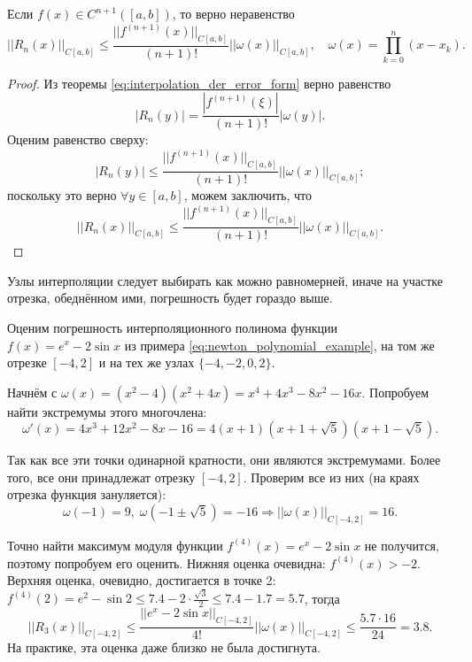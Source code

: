 \documentclass[../main.tex]{subfile}
\begin{document}
\begin{corollary}
	Если $f(x)\in C^{n+1}([a,b])$, то верно неравенство
	\[||R_n(x)||_{C[a,b]}\le \frac{||f^{(n+1)}(x)||_{C[a,b]}}{(n+1)!}
	||\omega(x)||_{C[a,b]},\quad \omega(x)=\prod_{k=0}^{n}(x-x_k).\]
\end{corollary}

\begin{proof}
	Из теоремы \eqref{eq:interpolation_der_error_form} верно равенство
	\[|R_n(y)|=\frac{|f^{(n+1)}(\xi)|}{(n+1)!}|\omega(y)|.\]
	Оценим равенство сверху:
	\[|R_n(y)|\le\frac{||f^{(n+1)}(x)||_{C[a,b]}}{(n+1)!}||\omega(x)||_
	{C[a,b]};\]
	поскольку это верно $\forall y\in[a,b]$, можем заключить, что
	\[||R_n(x)||_{C[a,b]}\le \frac{||f^{(n+1)}(x)||_{C[a,b]}}{(n+1)!}
	||\omega(x)||_{C[a,b]}.\]
\end{proof}

Узлы интерполяции следует выбирать как можно равномерней, иначе на участке
отрезка, обеднённом ими, погрешность будет гораздо выше.

\begin{example}
	Оценим погрешность интерполяционного полинома функции $f(x)=e^x-2\sin x$
	из примера \eqref{eq:newton_polynomial_example}, на том
	же отрезке $[-4,2]$ и на тех же узлах $\{-4,-2,0,2\}$.

	Начнём с $\omega(x)=(x^2-4)(x^2+4x)=x^4+4x^3-8x^2-16x$. Попробуем найти
	экстремумы этого многочлена:
	\[\omega'(x)=4x^3+12x^2-8x-16=4(x+1)(x+1+\sqrt 5)(x+1-\sqrt 5).\]

	Так как все эти точки одинарной кратности, они являются экстремумами.
	Более того, все они принадлежат отрезку $[-4,2]$. Проверим все из них
	(на краях отрезка функция зануляется):
	\[\omega(-1)=9,\;\omega(-1\pm\sqrt 5)=-16\Rightarrow
	||\omega(x)||_{C[-4,2]}=16.\]

	Точно найти максимум модуля функции $f^{(4)}(x)=e^x-2\sin x$ не
	получится, поэтому попробуем его оценить. Нижняя оценка очевидна:
	$f^{(4)}(x)>-2$. Верхняя оценка, очевидно, достигается в точке 2:
	$f^{(4)}(2)=e^2-\sin 2\le 7.4-2\cdot\frac{\sqrt 3}{2}\le 7.4-1.7=5.7$,
	тогда
	\[||R_3(x)||_{C[-4,2]}\le\frac{||e^x-2\sin x||_{C[-4,2]}}{4!}
	||\omega(x)||_{C[-4,2]}\le\frac{5.7\cdot 16}{24}=3.8.\]
	На практике, эта оценка даже близко не была достигнута.
\end{example}
\end{document}
